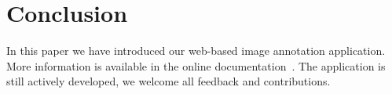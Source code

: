 \section{Conclusion}

In this paper we have introduced our web-based image annotation application.
More information is available in the online documentation~\cite{annotationappdoc}.
The application is still actively developed, we welcome all feedback and contributions.
